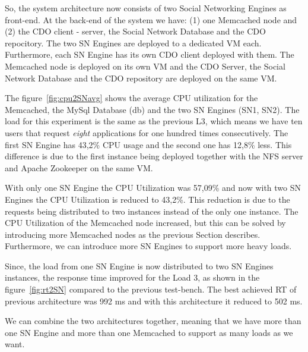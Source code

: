 So, the system architecture now consists of two Social Networking Engines as front-end. At the back-end of the system we have: (1) one Memcached node and (2) the CDO client - server, the Social Network Database and the CDO repocitory. The two SN Engines are deployed to a dedicated VM each. Furthermore, each SN Engine has its own CDO client deployed with them. The Memcached node is deployed on its own VM and the CDO Server, the Social Network Database and the CDO repository are deployed on the same VM.

The figure~\ref{fig:cpu2SNavg} shows the average CPU utilization for the Memcached, the MySql Database (db) and the two SN Engines (SN1, SN2). The load for this experiment is the same as the previous L3, which means we have ten users that request \emph{eight} applications for one hundred times consecutively. The first SN Engine has 43,2\% CPU usage and the second one has 12,8\% less. This difference is due to the first instance being deployed together with the NFS server and Apache Zookeeper on the same VM. 

With only one SN Engine the CPU Utilization was 57,09\% and now with two SN Engines the CPU Utilization is reduced to 43,2\%. This reduction is due to the requests being distributed to two instances instead of the only one instance. The CPU Utilization of the Memcached node increased, but this can be solved by introducing more Memcached nodes as the previous Section describes. Furthermore, we can introduce more SN Engines to support more heavy loads.

Since, the load from one SN Engine is now distributed to two SN Engines instances, the response time improved for the Load 3, as shown in the figure~\ref{fig:rt2SN} compared to the previous test-bench. The best achieved RT of previous architecture was 992 ms and with this architecture it reduced to 502 ms.

We can combine the two architectures together, meaning that we have more than one SN Engine and more than one Memcached to support as many loads as we want.

